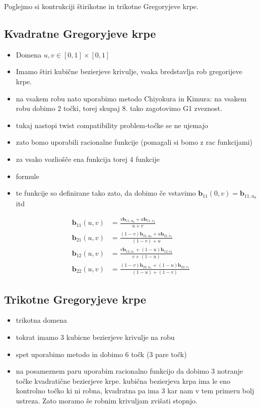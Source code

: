\documentclass[a4paper,12pt]{article}
\newcommand{\tbf}{\textbf}
\begin{document}
Poglejmo si kontrukciji štirikotne in trikotne Gregoryjeve krpe.

\subsection{Kvadratne Gregoryjeve krpe}

\begin{itemize}
	\item  Domena $u,v \in [0,1] \times [0,1]$
	\item Imamo štiri kubične bezierjeve krivulje, vsaka bredstavlja rob gregorijeve krpe.
	\item na vsakem robu nato uporabimo metodo Chiyokura in Kimura: na vsakem robu dobimo 2 točki, torej skupaj $8$. tako zagotovimo G1 zveznost.
	\item tukaj nastopi twist compatibility problem-točke se ne ujemajo
	\item zato bomo uporabili racionalne funkcije (pomagali si bomo z rac funkcijami)
	\item za vsako vozliošče ena funkcija torej 4 funkcije
	\item formule
	\item te funkcije so definirane tako zato, da dobimo če vstavimo $\tbf{b}_{11}(0,v) = \tbf{b}_{11,u_0}$ itd
\end{itemize}

\begin{align*}
\tbf{b}_{11}(u,v) &=  \frac{v \textbf{b}_{11,u_0}+u\tbf{b}_{11,v_0}}{u +v} \\
\tbf{b}_{21}(u,v) &= \frac{(1-v) \tbf{b}_{21,u_0}+u\tbf{b}_{21,v_1}}{(1-v)+u} \\
\tbf{b}_{12}(u,v) &= \frac{v \tbf{b}_{12,u_1}+(1-u)\tbf{b}_{12,v_0}}{v+(1-u)} \\
\tbf{b}_{22}(u,v) &= \frac{(1-v) \tbf{b}_{22,u_1}+(1-u)\tbf{b}_{22,v_1}}{(1-u)+(1-v)} 
\end{align*}	

\subsection{Trikotne Gregoryjeve krpe}
\begin{itemize}
	\item trikotna domena
	\item tokrat imamo 3 kubicne bezierjeve krivulje na robu
	\item spet uporabimo metodo in dobimo 6 točk (3 pare točk)
	\item na posameznem paru uporabim racionalno funkcijo da dobimo 3 notranje točke kvadratične bezierjeve krpe. kubična bezierjeva krpa ima le eno kontrolno točko ki ni robna, kvadratna pa ima 3 kar nam v tem primeru bolj ustreza. Zato moramo še robnim krivuljam zvišati stopnjo.
\end{itemize}
\end{document}
